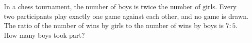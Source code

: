 In a chess tournament, the number of boys is twice the number of girls. Every two participants play exactly one game against each other, and no game is drawn. The ratio of the number of wins by girls to the number of wins by boys is $7:5$. How many boys took part?
